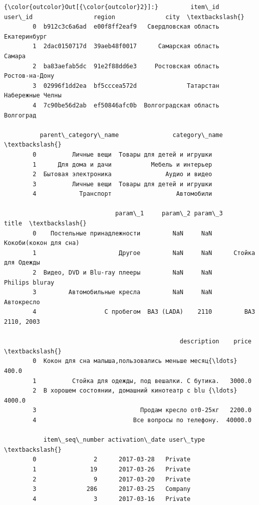 \documentclass[11pt]{article}
\begin{document}
\begin{Verbatim}[commandchars=\\\{\}]
{\color{outcolor}Out[{\color{outcolor}2}]:}         item\_id       user\_id                 region              city  \textbackslash{}
        0  b912c3c6a6ad  e00f8ff2eaf9   Свердловская область      Екатеринбург   
        1  2dac0150717d  39aeb48f0017      Самарская область            Самара   
        2  ba83aefab5dc  91e2f88dd6e3     Ростовская область    Ростов-на-Дону   
        3  02996f1dd2ea  bf5cccea572d              Татарстан  Набережные Челны   
        4  7c90be56d2ab  ef50846afc0b  Волгоградская область         Волгоград   
        
          parent\_category\_name               category\_name  \textbackslash{}
        0          Личные вещи  Товары для детей и игрушки   
        1      Для дома и дачи           Мебель и интерьер   
        2  Бытовая электроника               Аудио и видео   
        3          Личные вещи  Товары для детей и игрушки   
        4            Транспорт                  Автомобили   
        
                               param\_1     param\_2 param\_3                  title  \textbackslash{}
        0    Постельные принадлежности         NaN     NaN  Кокоби(кокон для сна)   
        1                       Другое         NaN     NaN      Стойка для Одежды   
        2  Видео, DVD и Blu-ray плееры         NaN     NaN         Philips bluray   
        3         Автомобильные кресла         NaN     NaN             Автокресло   
        4                   С пробегом  ВАЗ (LADA)    2110         ВАЗ 2110, 2003   
        
                                                 description    price  \textbackslash{}
        0  Кокон для сна малыша,пользовались меньше месяц{\ldots}    400.0   
        1          Стойка для одежды, под вешалки. С бутика.   3000.0   
        2  В хорошем состоянии, домашний кинотеатр с blu {\ldots}   4000.0   
        3                             Продам кресло от0-25кг   2200.0   
        4                           Все вопросы по телефону.  40000.0   
        
           item\_seq\_number activation\_date user\_type  \textbackslash{}
        0                2      2017-03-28   Private   
        1               19      2017-03-26   Private   
        2                9      2017-03-20   Private   
        3              286      2017-03-25   Company   
        4                3      2017-03-16   Private   
        

\end{Verbatim}
\end{document}
